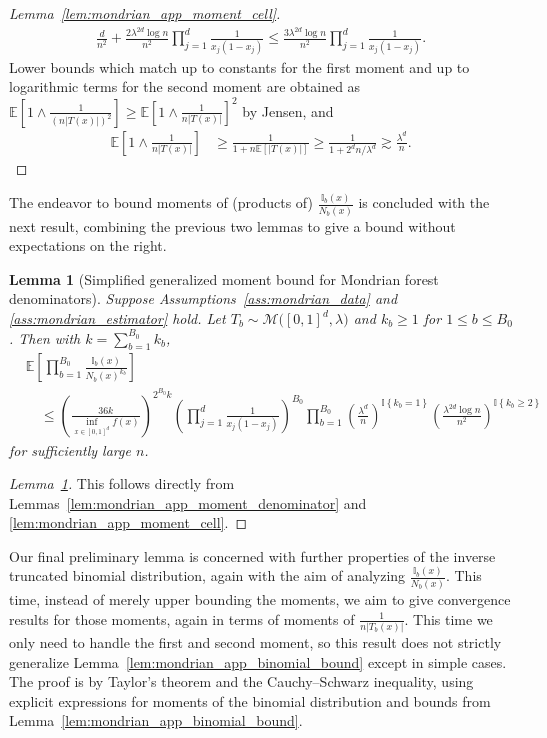 \documentclass[11pt,lof]{puthesis}
\newcommand{\E}{\ensuremath{\mathbb{E}}}
\newcommand{\I}{\ensuremath{\mathbb{I}}}
\newcommand{\cM}{\ensuremath{\mathcal{M}}}
\theoremstyle{break}
\newtheorem{lemma}{Lemma}[section]
\theoremstyle{proof}
\newtheorem{proof}{Proof}
\begin{document}
\begin{proof}[Lemma~\ref{lem:mondrian_app_moment_cell}]
\begin{align*}
    \frac{d}{n^2}
    + \frac{2 \lambda^{2d} \log n}{n^2}
    \prod_{j=1}^d
    \frac{1}{x_j(1-x_j)}
    \leq
    \frac{3 \lambda^{2d} \log n}{n^2}
    \prod_{j=1}^d
    \frac{1}{x_j(1-x_j)}.
  \end{align*}
  Lower bounds which match up to constants for the first moment and up to
  logarithmic terms for the second moment are obtained as
  $\E \left[ 1 \wedge \frac{1}{(n|T(x)|)^2} \right]
  \geq \E \left[ 1 \wedge \frac{1}{n|T(x)|} \right]^2$
  by Jensen, and
  \begin{align*}
    \E \left[ 1 \wedge \frac{1}{n|T(x)|} \right]
    &\geq \frac{1}{1 + n \E \left[ |T(x)| \right]}
    \geq \frac{1}{1 + 2^d n / \lambda^d}
    \gtrsim \frac{\lambda^d}{n}.
  \end{align*}
\end{proof}

The endeavor to bound moments of (products of) $\frac{\I_b(x)}{N_b(x)}$ is
concluded with the next result, combining the previous two lemmas to give a
bound without expectations on the right.

\begin{lemma}[Simplified generalized moment bound for
  Mondrian forest denominators]%
  \label{lem:mondrian_app_simple_moment_denominator}
  Suppose Assumptions~\ref{ass:mondrian_data}
  and \ref{ass:mondrian_estimator} hold.
  Let $T_b \sim \cM\big([0,1]^d, \lambda\big)$
  and $k_b \geq 1$ for $1 \leq b \leq B_0$.
  Then with $k = \sum_{b=1}^{B_0} k_b$,
  \begin{align*}
    &\E\left[
      \prod_{b=1}^{B_0}
      \frac{\I_b(x)}{N_b(x)^{k_b}}
    \right] \\
    &\quad\leq
    \left( \frac{36k}{\inf_{x \in [0,1]^d} f(x)} \right)^{2^{B_0} k}
    \left(
      \prod_{j=1}^{d} \frac{1}{x_j (1-x_j)}
    \right)^{B_0}
    \prod_{b=1}^{B_0}
    \left(
      \frac{\lambda^d}{n}
    \right)^{\I \left\{ k_b = 1 \right\}}
    \left(
      \frac{\lambda^{2d} \log n}{n^2}
    \right)^{\I \left\{ k_b \geq 2 \right\}}
  \end{align*}
  for sufficiently large $n$.
\end{lemma}

\begin{proof}[Lemma~\ref{lem:mondrian_app_simple_moment_denominator}]
  This follows directly from
  Lemmas~\ref{lem:mondrian_app_moment_denominator} and
  \ref{lem:mondrian_app_moment_cell}.
\end{proof}

Our final preliminary lemma is concerned with further properties of
the inverse truncated binomial distribution, again with the aim
of analyzing $\frac{\I_b(x)}{N_b(x)}$.
This time, instead of merely upper bounding the moments,
we aim to give convergence results for those moments,
again in terms of moments of $\frac{1}{n |T_b(x)|}$.
This time we only need to handle the first
and second moment, so this result does not strictly generalize
Lemma~\ref{lem:mondrian_app_binomial_bound} except in simple cases.
The proof is by Taylor's theorem and the Cauchy--Schwarz inequality,
using explicit expressions for moments of the binomial distribution
and bounds from Lemma~\ref{lem:mondrian_app_binomial_bound}.
\end{document}

